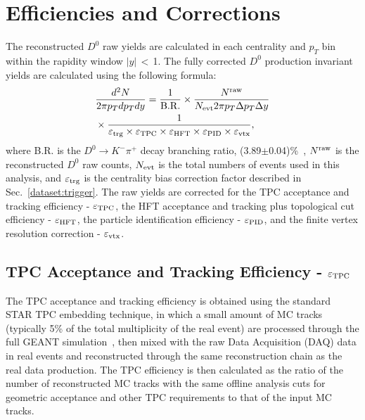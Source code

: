 \documentclass[%
 reprint,	
showpacs,
 amsmath,amssymb,
 aps,
 prc,
]{revtex4-1}
\begin{document}
\section{Efficiencies and Corrections}
\label{correction}

The reconstructed $D^0$ raw yields are calculated in each centrality and $p_{T}$ bin within the rapidity window $|y|$\,$<$\,1. The fully corrected $D^0$ production invariant yields are calculated using the following formula:
\begin{equation}
  \begin{aligned}
& \frac{d^2N}{2\pi p_{T}dp_{T}dy} = \frac{1}{\rm B.R.} \times \frac{N^{\rm raw}}{N_{\rm evt} 2\pi p_{T}\Delta p_{T}\Delta y} \\
& \times \frac{1}{\varepsilon_{\rm trg}\times\varepsilon_{\rm TPC}\times\varepsilon_{\rm HFT}\times\varepsilon_{\rm PID}\times\varepsilon_{\rm vtx}},
  \end{aligned}
\label{equ:invariantyield}
\end{equation}
where B.R. is the $D^0\rightarrow K^-\pi^+$ decay branching ratio, (3.89$\pm$0.04)\%~\cite{pdg}, $N^{\rm raw}$ is the reconstructed $D^0$ raw counts, $N_{\rm evt}$ is the total numbers of events used in this analysis, and $\varepsilon_{\rm trg}$ is the centrality bias correction factor described in Sec.~\ref{dataset:trigger}. The raw yields are corrected for the TPC acceptance and tracking efficiency - $\varepsilon_{\rm TPC}$, the HFT acceptance and tracking plus topological cut efficiency - $\varepsilon_{\rm HFT}$, the particle identification efficiency - $\varepsilon_{\rm PID}$, and the finite vertex resolution correction - $\varepsilon_{\rm vtx}$.

\subsection{TPC Acceptance and Tracking Efficiency - $\varepsilon_{\rm TPC}$}
\label{correction:tpc}

The TPC acceptance and tracking efficiency is obtained using the standard STAR TPC embedding technique, in which a small amount of MC tracks (typically 5\% of the total multiplicity of the real event) are processed through the full GEANT simulation~\cite{GEANT3}, then mixed with the raw Data Acquisition (DAQ) data in real events and reconstructed through the same reconstruction chain as the real data production. The TPC efficiency is then calculated as the ratio of the number of reconstructed MC tracks with the same offline analysis cuts for geometric acceptance and other TPC requirements to that of the input MC tracks.
\end{document}
